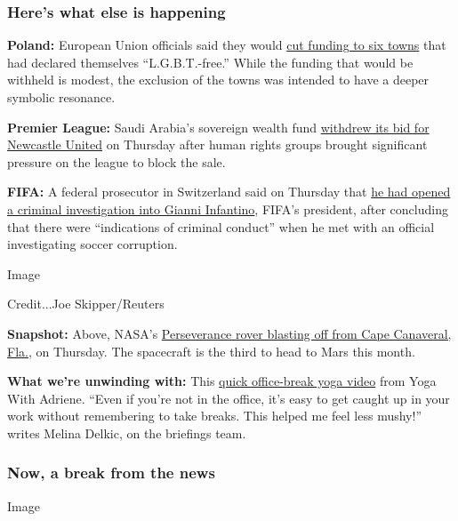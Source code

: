 \hypertarget{heres-what-else-is-happening}{%
\subsubsection{Here's what else is
happening}\label{heres-what-else-is-happening}}

\textbf{Poland:} European Union officials said they would
\href{https://www.nytimes.com/2020/07/30/world/europe/LGBT-free-poland-EU-funds.html}{cut
funding to six towns} that had declared themselves ``L.G.B.T.-free.''
While the funding that would be withheld is modest, the exclusion of the
towns was intended to have a deeper symbolic resonance.

\textbf{Premier League:} Saudi Arabia's sovereign wealth fund
\href{https://www.nytimes.com/2020/07/30/sports/soccer/saudi-arabia-newcastle-united.html}{withdrew
its bid for Newcastle United} on Thursday after human rights groups
brought significant pressure on the league to block the sale.

\textbf{FIFA:} A federal prosecutor in Switzerland said on Thursday that
\href{https://www.nytimes.com/2020/07/30/sports/soccer/fifa-gianni-infantino-investigation.html}{he
had opened a criminal investigation into Gianni Infantino}, FIFA's
president, after concluding that there were ``indications of criminal
conduct'' when he met with an official investigating soccer corruption.

Image

Credit...Joe Skipper/Reuters

\textbf{Snapshot:} Above, NASA's
\href{https://www.nytimes.com/2020/07/30/science/nasa-mars-launch.html}{Perseverance
rover blasting off from Cape Canaveral, Fla.}, on Thursday. The
spacecraft is the third to head to Mars this month.

\textbf{What we're unwinding with:} This
\href{https://www.youtube.com/watch?v=M-8FvC3GD8c}{quick office-break
yoga video} from Yoga With Adriene. ``Even if you're not in the office,
it's easy to get caught up in your work without remembering to take
breaks. This helped me feel less mushy!'' writes Melina Delkic, on the
briefings team.

\hypertarget{now-a-break-from-the-news}{%
\subsubsection{Now, a break from the
news}\label{now-a-break-from-the-news}}

Image

